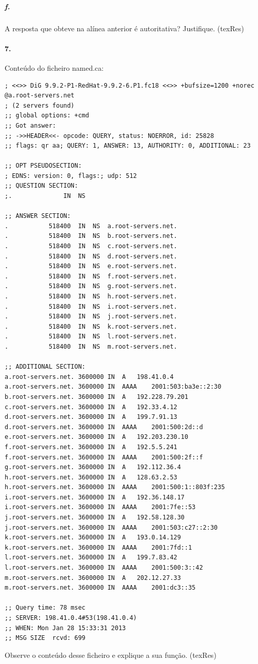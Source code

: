 \newpage
\subparagraph{f.}
A resposta que obteve na alínea anterior é autoritativa? Justifique. (texRes)


\paragraph{7.}

Conteúdo do ficheiro \textsf{named.ca}:

\begin{verbatim}
; <<>> DiG 9.9.2-P1-RedHat-9.9.2-6.P1.fc18 <<>> +bufsize=1200 +norec @a.root-servers.net
; (2 servers found)
;; global options: +cmd
;; Got answer:
;; ->>HEADER<<- opcode: QUERY, status: NOERROR, id: 25828
;; flags: qr aa; QUERY: 1, ANSWER: 13, AUTHORITY: 0, ADDITIONAL: 23

;; OPT PSEUDOSECTION:
; EDNS: version: 0, flags:; udp: 512
;; QUESTION SECTION:
;.				IN	NS

;; ANSWER SECTION:
.			518400	IN	NS	a.root-servers.net.
.			518400	IN	NS	b.root-servers.net.
.			518400	IN	NS	c.root-servers.net.
.			518400	IN	NS	d.root-servers.net.
.			518400	IN	NS	e.root-servers.net.
.			518400	IN	NS	f.root-servers.net.
.			518400	IN	NS	g.root-servers.net.
.			518400	IN	NS	h.root-servers.net.
.			518400	IN	NS	i.root-servers.net.
.			518400	IN	NS	j.root-servers.net.
.			518400	IN	NS	k.root-servers.net.
.			518400	IN	NS	l.root-servers.net.
.			518400	IN	NS	m.root-servers.net.

;; ADDITIONAL SECTION:
a.root-servers.net.	3600000	IN	A	198.41.0.4
a.root-servers.net.	3600000	IN	AAAA	2001:503:ba3e::2:30
b.root-servers.net.	3600000	IN	A	192.228.79.201
c.root-servers.net.	3600000	IN	A	192.33.4.12
d.root-servers.net.	3600000	IN	A	199.7.91.13
d.root-servers.net.	3600000	IN	AAAA	2001:500:2d::d
e.root-servers.net.	3600000	IN	A	192.203.230.10
f.root-servers.net.	3600000	IN	A	192.5.5.241
f.root-servers.net.	3600000	IN	AAAA	2001:500:2f::f
g.root-servers.net.	3600000	IN	A	192.112.36.4
h.root-servers.net.	3600000	IN	A	128.63.2.53
h.root-servers.net.	3600000	IN	AAAA	2001:500:1::803f:235
i.root-servers.net.	3600000	IN	A	192.36.148.17
i.root-servers.net.	3600000	IN	AAAA	2001:7fe::53
j.root-servers.net.	3600000	IN	A	192.58.128.30
j.root-servers.net.	3600000	IN	AAAA	2001:503:c27::2:30
k.root-servers.net.	3600000	IN	A	193.0.14.129
k.root-servers.net.	3600000	IN	AAAA	2001:7fd::1
l.root-servers.net.	3600000	IN	A	199.7.83.42
l.root-servers.net.	3600000	IN	AAAA	2001:500:3::42
m.root-servers.net.	3600000	IN	A	202.12.27.33
m.root-servers.net.	3600000	IN	AAAA	2001:dc3::35

;; Query time: 78 msec
;; SERVER: 198.41.0.4#53(198.41.0.4)
;; WHEN: Mon Jan 28 15:33:31 2013
;; MSG SIZE  rcvd: 699
\end{verbatim}

Observe o conteúdo desse ficheiro e explique a sua função. (texRes)